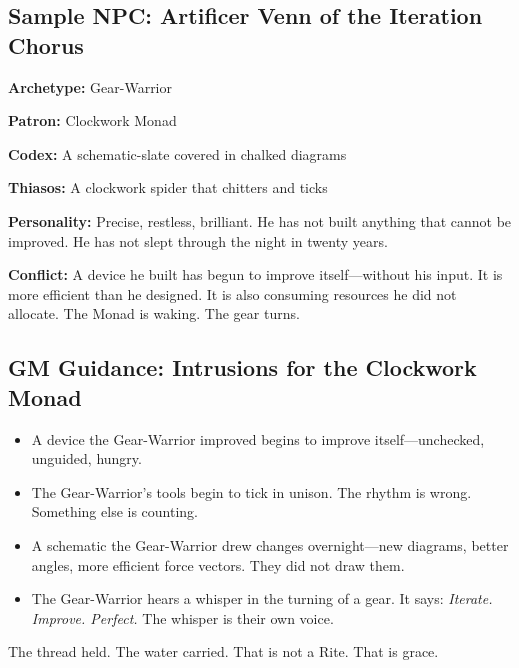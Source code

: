 \subsection{Sample NPC: Artificer Venn of the Iteration Chorus}

\textbf{Archetype:} Gear-Warrior

\textbf{Patron:} Clockwork Monad

\textbf{Codex:} A schematic-slate covered in chalked diagrams

\textbf{Thiasos:} A clockwork spider that chitters and ticks

\textbf{Personality:} Precise, restless, brilliant. He has not built anything that cannot be improved. He has not slept through the night in twenty years.

\textbf{Conflict:} A device he built has begun to improve itself—without his input. It is more efficient than he designed. It is also consuming resources he did not allocate. The Monad is waking. The gear turns.

\subsection{GM Guidance: Intrusions for the Clockwork Monad}

\begin{itemize}
\item A device the Gear-Warrior improved begins to improve itself—unchecked, unguided, hungry.
\item The Gear-Warrior's tools begin to tick in unison. The rhythm is wrong. Something else is counting.
\item A schematic the Gear-Warrior drew changes overnight—new diagrams, better angles, more efficient force vectors. They did not draw them.
\item The Gear-Warrior hears a whisper in the turning of a gear. It says: \textit{Iterate. Improve. Perfect.} The whisper is their own voice.
\end{itemize}

The thread held. The water carried. That is not a Rite. That is grace.
